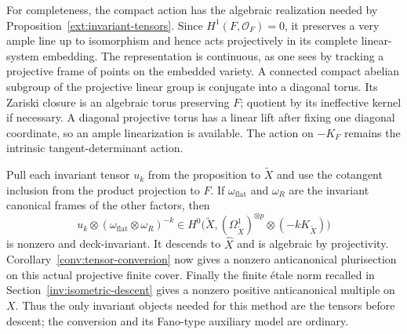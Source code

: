 For completeness, the compact action has the algebraic realization
needed by Proposition~\ref{ext:invariant-tensors}.
Since $H^1(F,\mathcal O_F)=0$, it preserves a very ample line up
to isomorphism and hence acts projectively in its complete
linear-system embedding.  The representation is continuous, as
one sees by tracking a projective frame of points on the embedded
variety.  A connected compact abelian subgroup of the projective
linear group is conjugate into a diagonal torus.  Its Zariski
closure is an algebraic torus preserving $F$; quotient by its
ineffective kernel if necessary.  A diagonal projective torus
has a linear lift after fixing one diagonal coordinate, so an
ample linearization is available.  The action on $-K_F$ remains
the intrinsic tangent-determinant action.

Pull each invariant tensor $u_k$ from the proposition to
$\widetilde X$ and use the cotangent inclusion from the product
projection to $F$.  If $\omega_{\mathrm{flat}}$ and $\omega_R$
are the invariant canonical frames of the other factors, then
\[
 u_k\otimes(\omega_{\mathrm{flat}}\otimes\omega_R)^{-k}
 \in H^0\bigl(\widetilde X,
          (\Omega_{\widetilde X}^1)^{\otimes p}
                         \otimes(-kK_{\widetilde X})\bigr)
\]
is nonzero and deck-invariant.  It descends to $\widehat X$ and
is algebraic by projectivity.  Corollary~\ref{conv:tensor-conversion}
now gives a nonzero anticanonical plurisection on this actual
projective finite cover.  Finally the finite \'etale norm recalled
in Section~\ref{inv:isometric-descent} gives a nonzero positive
anticanonical multiple on $X$.  Thus the only invariant objects
needed for this method are the tensors before descent; the
conversion and its Fano-type auxiliary model are ordinary.

